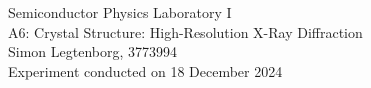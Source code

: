 \begin{centering}
	\huge Semiconductor Physics Laboratory \RN{1}\\
	\LARGE A6: Crystal Structure: High-Resolution X-Ray Diffraction\\
	\vspace{0.35cm}
	\normalsize Simon Legtenborg, 3773994 \\ 
	\normalsize Experiment conducted on 18 December 2024 \\
	\vspace{1cm}
\end{centering}
